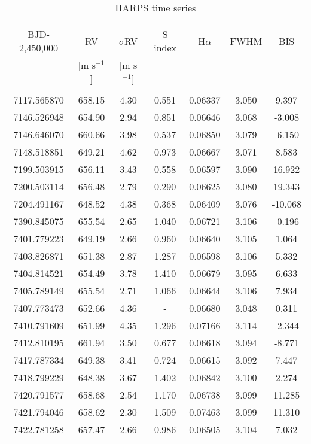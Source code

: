 \begin{table}
\small
\renewcommand{\arraystretch}{0.7}
\centering
\caption{HARPS time series}
\label{k218table:data}
\begin{tabular}{ccccccc}
\hline \\ [-1ex]
BJD-2,450,000 & RV & $\sigma$RV & S index & H$\alpha$ & FWHM & BIS \\
& [m s$^{-1}$] & [m s$^{-1}$] &  &  & & \\
\hline \\ [-1ex]
7117.565870 & 658.15 & 4.30 & 0.551 & 0.06337 & 3.050 & 9.397 \\
7146.526948 & 654.90 & 2.94 & 0.851 & 0.06646 & 3.068 & -3.008 \\
7146.646070 & 660.66 & 3.98 & 0.537 & 0.06850 & 3.079 & -6.150 \\
7148.518851 & 649.21 & 4.62 & 0.973 & 0.06667 & 3.071 & 8.583 \\
7199.503915 & 656.11 & 3.43 & 0.558 & 0.06597 & 3.090 & 16.922 \\
7200.503114 & 656.48 & 2.79 & 0.290 & 0.06625 & 3.080 & 19.343 \\
7204.491167 & 648.52 & 4.38 & 0.368 & 0.06409 & 3.076 & -10.068 \\
7390.845075 & 655.54 & 2.65 & 1.040 & 0.06721 & 3.106 & -0.196 \\
7401.779223 & 649.19 & 2.66 & 0.960 & 0.06640 & 3.105 & 1.064 \\
7403.826871 & 651.38 & 2.87 & 1.287 & 0.06598 & 3.106 & 5.332 \\
7404.814521 & 654.49 & 3.78 & 1.410 & 0.06679 & 3.095 & 6.633 \\
7405.789149 & 655.54 & 2.71 & 1.066 & 0.06644 & 3.106 & 7.934 \\
7407.773473 & 652.66 & 4.36 & - & 0.06680 & 3.048 & 0.311 \\
7410.791609 & 651.99 & 4.35 & 1.296 & 0.07166 & 3.114 & -2.344 \\
7412.810195 & 661.94 & 3.50 & 0.677 & 0.06618 & 3.094 & -8.771 \\
7417.787334 & 649.38 & 3.41 & 0.724 & 0.06615 & 3.092 & 7.447 \\
7418.799229 & 648.38 & 3.67 & 1.402 & 0.06842 & 3.100 & 2.274 \\
7420.791577 & 658.68 & 2.54 & 1.170 & 0.06738 & 3.099 & 11.285 \\
7421.794046 & 658.62 & 2.30 & 1.509 & 0.07463 & 3.099 & 11.310 \\
7422.781258 & 657.47 & 2.66 & 0.986 & 0.06505 & 3.104 & 7.032 \\

\end{tabular}
\end{table}
